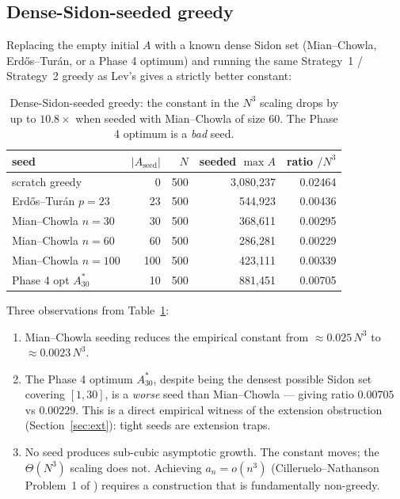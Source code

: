 \documentclass[11pt]{article}
\begin{document}
\subsection{Dense-Sidon-seeded greedy}

Replacing the empty initial $A$ with a known dense Sidon set
(Mian--Chowla, Erd\H{o}s--Tur\'an, or a Phase 4 optimum) and running
the same Strategy~1 / Strategy~2 greedy as Lev's gives a strictly
better constant:

\begin{table}[ht]
\centering
\begin{tabular}{l r r r r}
\toprule
seed & $|A_{\text{seed}}|$ & $N$ & seeded $\max A$ & ratio $/N^3$ \\
\midrule
scratch greedy            & 0   & 500 & 3,080,237 & 0.02464 \\
Erd\H{o}s--Tur\'an $p=23$ & 23  & 500 &   544,923 & 0.00436 \\
Mian--Chowla $n=30$       & 30  & 500 &   368,611 & 0.00295 \\
Mian--Chowla $n=60$       & 60  & 500 &   286,281 & 0.00229 \\
Mian--Chowla $n=100$      & 100 & 500 &   423,111 & 0.00339 \\
Phase 4 opt $A_{30}^*$    & 10  & 500 &   881,451 & 0.00705 \\
\bottomrule
\end{tabular}
\caption{Dense-Sidon-seeded greedy: the constant in the $N^3$ scaling
drops by up to $10.8\times$ when seeded with Mian--Chowla of size 60.
The Phase 4 optimum is a \emph{bad} seed.}
\label{tab:seeded}
\end{table}

Three observations from Table~\ref{tab:seeded}:

\begin{enumerate}
\item Mian--Chowla seeding reduces the empirical constant from
      $\approx 0.025\,N^3$ to $\approx 0.0023\,N^3$.

\item The Phase 4 optimum $A_{30}^*$, despite being the densest possible
      Sidon set covering $[1, 30]$, is a \emph{worse} seed than
      Mian--Chowla --- giving ratio $0.00705$ vs $0.00229$. This is a
      direct empirical witness of the extension obstruction
      (Section~\ref{sec:ext}): tight seeds are extension traps.

\item No seed produces sub-cubic asymptotic growth. The constant moves;
      the $\Theta(N^3)$ scaling does not. Achieving $a_n = o(n^3)$
      (Cilleruelo--Nathanson Problem~1 of \cite{CiNa08}) requires a
      construction that is fundamentally non-greedy.
\end{enumerate}
\end{document}
